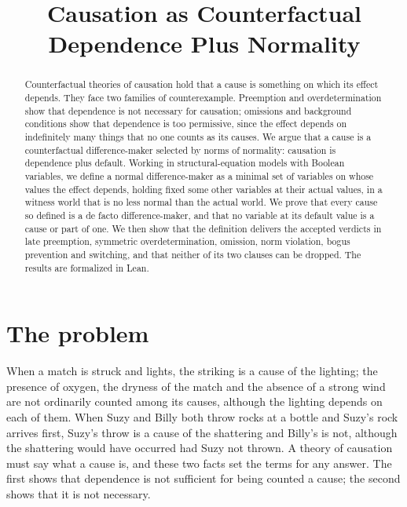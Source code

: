 \documentclass{situationist-preprint}
\title{Causation as Counterfactual Dependence Plus Normality}
\begin{document}
\maketitle

\begin{abstract}
Counterfactual theories of causation hold that a cause is something on which its effect depends. They face two families of counterexample. Preemption and overdetermination show that dependence is not necessary for causation; omissions and background conditions show that dependence is too permissive, since the effect depends on indefinitely many things that no one counts as its causes. We argue that a cause is a counterfactual difference-maker selected by norms of normality: causation is dependence plus default. Working in structural-equation models with Boolean variables, we define a normal difference-maker as a minimal set of variables on whose values the effect depends, holding fixed some other variables at their actual values, in a witness world that is no less normal than the actual world. We prove that every cause so defined is a de facto difference-maker, and that no variable at its default value is a cause or part of one. We then show that the definition delivers the accepted verdicts in late preemption, symmetric overdetermination, omission, norm violation, bogus prevention and switching, and that neither of its two clauses can be dropped. The results are formalized in Lean.
\end{abstract}

\section{The problem}\label{s:problem}

When a match is struck and lights, the striking is a cause of the lighting; the presence of oxygen, the dryness of the match and the absence of a strong wind are not ordinarily counted among its causes, although the lighting depends on each of them. When Suzy and Billy both throw rocks at a bottle and Suzy's rock arrives first, Suzy's throw is a cause of the shattering and Billy's is not, although the shattering would have occurred had Suzy not thrown. A theory of causation must say what a cause is, and these two facts set the terms for any answer. The first shows that dependence is not sufficient for being counted a cause; the second shows that it is not necessary.
\end{document}
